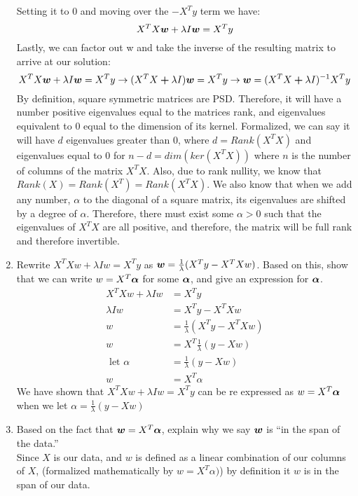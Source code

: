 \documentclass{article}
\theoremstyle{plain}
\theoremstyle{definition}
\begin{document}
\begin{enumerate}
Setting it to 0 and moving over the $-X^Ty$ term we have:
$$
X^{T}X\boldsymbol{w}+\lambda I\boldsymbol{w}=X^{T}y
$$
Lastly, we can factor out w and take the inverse of the resulting matrix to arrive at our solution:
$$
X^{T}X\boldsymbol{w}+\lambda I\boldsymbol{w}=X^{T}y \rightarrow (X^{T}X\boldsymbol{+}\lambda I)\boldsymbol{w}=X^{T}y \rightarrow \boldsymbol{w}=(X^{T}X\boldsymbol{+}\lambda I)^{-1} X^{T}y
$$
By definition, square symmetric matrices are PSD. Therefore, it will have a number positive eigenvalues equal to the matrices rank, and eigenvalues equivalent to 0 equal to the dimension of its kernel. Formalized, we can say it will have $d$ eigenvalues greater than 0, where $d=Rank(X^TX)$ and eigenvalues equal to 0 for $n-d = dim(ker(X^TX))$ where $n$ is the number of columns of the matrix $X^TX$. Also, due to rank nullity, we know that $Rank(X)=Rank(X^T) = Rank(X^TX)$. We also know that when we add any number, $\alpha$ to the diagonal of a square matrix, its eigenvalues are shifted by a degree of $\alpha$. Therefore, there must exist some $\alpha>0$ such that the eigenvalues of $X^TX$ are all positive, and therefore, the matrix will be full rank and therefore invertible. 
\item Rewrite $X^{T}Xw+\lambda Iw=X^{T}y$ as $\boldsymbol{w}=\frac{1}{\lambda}(X^{T}y-X^{T}Xw)$.
Based on this, show that we can write $w=X^{T}\boldsymbol{\alpha}$ for some $\boldsymbol{\alpha}$,
and give an expression for $\boldsymbol{\alpha}$.\\
\subitem
\begin{equation}
\begin{split}
    X^{T}Xw+\lambda Iw &=X^{T}y \\
    \lambda Iw &=X^{T}y -X^{T}Xw \\
    w &= \frac{1}{\lambda}(X^{T}y -X^{T}Xw) \\
    w &= X^T \frac{1}{\lambda} (y-Xw) \\
    \text{ let }\alpha &= \frac{1}{\lambda} (y-Xw) \\
    w &= X^T \alpha
\end{split}
\end{equation}
We have shown that $X^{T}Xw+\lambda Iw=X^{T}y$ can be re expressed as $w=X^{T}\boldsymbol{\alpha}$ when we let $\alpha = \frac{1}{\lambda} (y-Xw)$
\item Based on the fact that $\boldsymbol{w}=X^{T}\boldsymbol{\alpha}$, explain why we say $\boldsymbol{w}$ is ``in
the span of the data.''\\
\subitem Since $X$ is our data, and $w$ is defined as a linear combination of our columns of $X$, (formalized mathematically by $w=X^T\alpha)$) by definition it $w$ is in the span of our data.

\end{enumerate}
\end{document}
